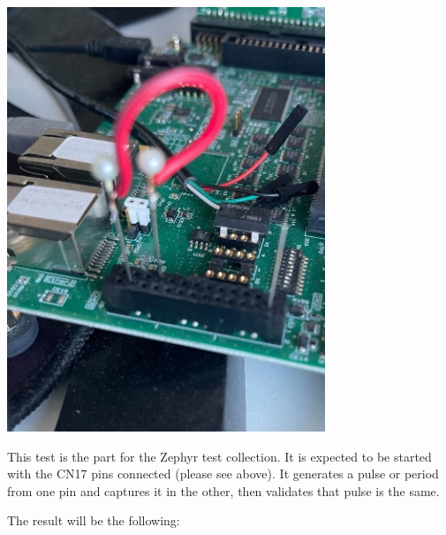 \documentclass[11pt,a4paper,oneside]{article}
\begin{document}
\includegraphics[width=3.75in,height=5in]{./media/image5.jpg}

This test is the part for the Zephyr test collection. It is expected to
be started with the CN17 pins connected (please see above). It generates
a pulse or period from one pin and captures it in the other, then
validates that pulse is the same.

The result will be the following:
\end{document}

